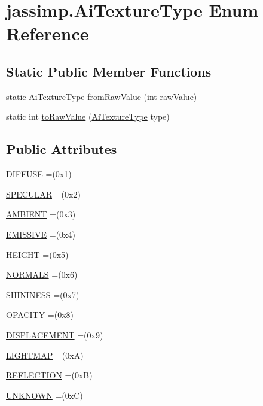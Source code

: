\hypertarget{enumjassimp_1_1_ai_texture_type}{\section{jassimp.\+Ai\+Texture\+Type Enum Reference}
\label{enumjassimp_1_1_ai_texture_type}
}
\subsection*{Static Public Member Functions}
\begin{DoxyCompactItemize}
\item 
static \hyperlink{enumjassimp_1_1_ai_texture_type}{Ai\+Texture\+Type} \hyperlink{enumjassimp_1_1_ai_texture_type_adaed07edc1924d613298e989ee805447}{from\+Raw\+Value} (int raw\+Value)
\item 
static int \hyperlink{enumjassimp_1_1_ai_texture_type_aa2cc71199dbb2b937e24318ea57d035f}{to\+Raw\+Value} (\hyperlink{enumjassimp_1_1_ai_texture_type}{Ai\+Texture\+Type} type)
\end{DoxyCompactItemize}
\subsection*{Public Attributes}
\begin{DoxyCompactItemize}
\item 
\hyperlink{enumjassimp_1_1_ai_texture_type_ac975561d02071a3313c9ce899e4c717f}{D\+I\+F\+F\+U\+S\+E} =(0x1)
\item 
\hyperlink{enumjassimp_1_1_ai_texture_type_a6e96964bdcdea35072b135cbe4cd8cc9}{S\+P\+E\+C\+U\+L\+A\+R} =(0x2)
\item 
\hyperlink{enumjassimp_1_1_ai_texture_type_aa58207925555076484eebefd7c45e545}{A\+M\+B\+I\+E\+N\+T} =(0x3)
\item 
\hyperlink{enumjassimp_1_1_ai_texture_type_ae0a44e5f47d1ae2ac1e4aa8dd442d683}{E\+M\+I\+S\+S\+I\+V\+E} =(0x4)
\item 
\hyperlink{enumjassimp_1_1_ai_texture_type_a2ae5ea05b8cf669d375fd8073e7066be}{H\+E\+I\+G\+H\+T} =(0x5)
\item 
\hyperlink{enumjassimp_1_1_ai_texture_type_ae458458e68ca6abaa1b14057b139aead}{N\+O\+R\+M\+A\+L\+S} =(0x6)
\item 
\hyperlink{enumjassimp_1_1_ai_texture_type_a99fdd3d7d88e306a282adb73b355910c}{S\+H\+I\+N\+I\+N\+E\+S\+S} =(0x7)
\item 
\hyperlink{enumjassimp_1_1_ai_texture_type_a87749b5be55335a4bd408daae1ef16df}{O\+P\+A\+C\+I\+T\+Y} =(0x8)
\item 
\hyperlink{enumjassimp_1_1_ai_texture_type_a7aa2913d5247b5ef2215738a7c64b82a}{D\+I\+S\+P\+L\+A\+C\+E\+M\+E\+N\+T} =(0x9)
\item 
\hyperlink{enumjassimp_1_1_ai_texture_type_abd4c98c38f08251ce364e06f24121a54}{L\+I\+G\+H\+T\+M\+A\+P} =(0x\+A)
\item 
\hyperlink{enumjassimp_1_1_ai_texture_type_a1895e31625c8dd581b370692dfd1b6bd}{R\+E\+F\+L\+E\+C\+T\+I\+O\+N} =(0x\+B)
\item 
\hyperlink{enumjassimp_1_1_ai_texture_type_a641980192dc354719b10ebae097fccd1}{U\+N\+K\+N\+O\+W\+N} =(0x\+C)
\end{DoxyCompactItemize}


